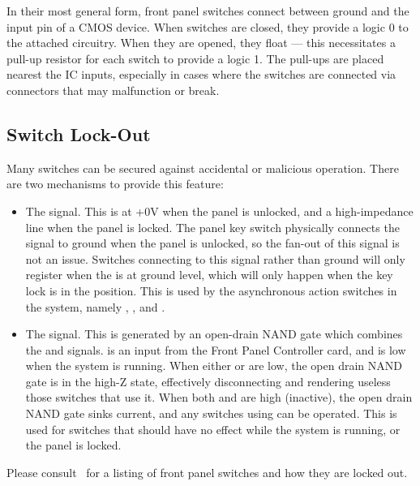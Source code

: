 In their most general form, front panel switches connect between ground and the
input pin of a CMOS device. When switches are closed, they provide a logic 0 to
the attached circuitry. When they are opened, they float — this necessitates a
pull-up resistor for each switch to provide a logic 1. The pull-ups are placed
nearest the IC inputs, especially in cases where the switches are connected via
connectors that may malfunction or break.

\subsection{Switch Lock-Out}

Many switches can be secured against accidental or malicious operation. There
are two mechanisms to provide this feature:

\begin{itemize}
  \item The  signal. This is at +0V when the panel is unlocked, and a
    high-impedance line when the panel is locked.  The panel key switch
    physically connects the  signal to ground when the panel is
    unlocked, so the fan-out of this signal is not an issue.  Switches
    connecting to this signal rather than ground will only register when the
     is at ground level, which will only happen when the key lock is
    in the  position.  This is used by the asynchronous action
    switches in the system, namely , ,  and
    .

  \item The  signal. This is generated by an open-drain NAND gate
    which combines the  and  signals.  is
    an input from the Front Panel Controller card, and is low when the system
    is running. When either  or  are low, the open drain
    NAND gate is in the high-Z state, effectively disconnecting  and
    rendering useless those switches that use it. When both  and
     are high (inactive), the open drain NAND gate sinks current, and
    any switches using  can be operated. This is used for switches
    that should have no effect while the system is running, or the panel is
    locked.
\end{itemize}

Please consult~ for a listing of front panel switches and
how they are locked out.

